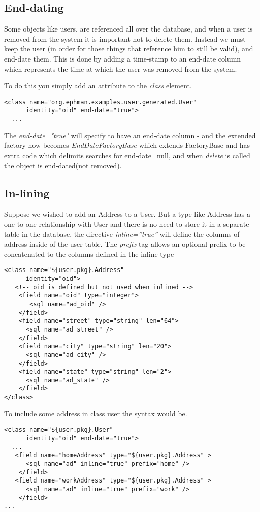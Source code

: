 \documentclass[10pt,openany]{book}
\begin{document}
\subsection{End-dating}

Some objects like users, are referenced all over the database, and
when a user is removed from the system it is important not to delete
them.  Instead we must keep the user (in order for those things that
reference him to still be valid), and end-date them.  This is done by
adding a time-stamp to an end-date column which represents the time at
which the user was removed from the system.

To do this you simply add an attribute to the \textit{class} element.

\begin{verbatim}
<class name="org.ephman.examples.user.generated.User"
      identity="oid" end-date="true">
  ... 
\end{verbatim}

The \textit{end-date="true"} will specify to have an end-date column -
and the extended factory now becomes \emph{EndDateFactoryBase} which
extends FactoryBase and has extra code which delimits searches for
end-date=null, and when \emph{delete} is called the object is
end-dated(not removed).

\subsection{In-lining}
Suppose we wished to add an Address to a User.  But a type like
Address has a one to one relationship with User and there is no need
to store it in a separate table in the database, the directive
\textit{inline=''true''} will define the columns of address inside of
the user table.  The \textit{prefix} tag allows an optional prefix to
be concatenated to the columns defined in the inline-type
\begin{verbatim}
<class name="${user.pkg}.Address"
      identity="oid">
   <!-- oid is defined but not used when inlined -->
    <field name="oid" type="integer">
       <sql name="ad_oid" />
    </field>
	<field name="street" type="string" len="64">
      <sql name="ad_street" />
    </field>    
    <field name="city" type="string" len="20">
      <sql name="ad_city" />
    </field>
    <field name="state" type="string" len="2">
      <sql name="ad_state" />
    </field>
</class>
\end{verbatim}
To include some address in class user the syntax would be.
\begin{verbatim}
<class name="${user.pkg}.User"
      identity="oid" end-date="true">
  ... 
   <field name="homeAddress" type="${user.pkg}.Address" >
      <sql name="ad" inline="true" prefix="home" />
    </field>
   <field name="workAddress" type="${user.pkg}.Address" >
      <sql name="ad" inline="true" prefix="work" />
    </field>
...
\end{verbatim}
\end{document}
